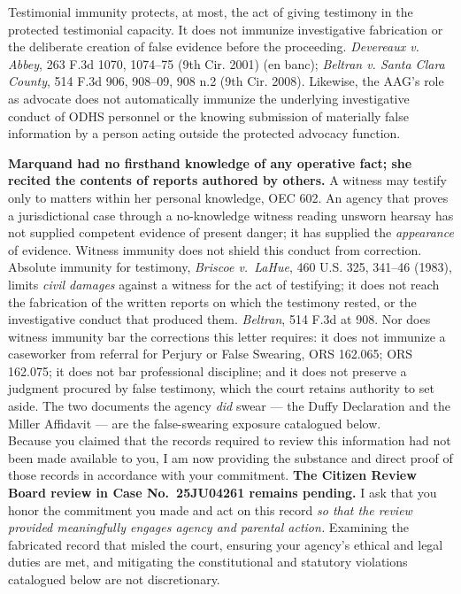 \documentclass[10pt,a4paper,roman]{moderncv}
\begin{document}
\begin{enumerate}[leftmargin=*,itemsep=0.35em,topsep=0.3em,resume]
Testimonial immunity protects, at most, the act of giving testimony in the protected testimonial capacity. It does not immunize investigative fabrication or the deliberate creation of false evidence before the proceeding. \textit{Devereaux v. Abbey}, 263 F.3d 1070, 1074--75 (9th Cir. 2001) (en banc); \textit{Beltran v. Santa Clara County}, 514 F.3d 906, 908--09, 908 n.2 (9th Cir. 2008). Likewise, the AAG's role as advocate does not automatically immunize the underlying investigative conduct of ODHS personnel or the knowing submission of materially false information by a person acting outside the protected advocacy function.

\textbf{Marquand had no firsthand knowledge of any operative fact; she recited the contents of reports authored by others.} A witness may testify only to matters within her personal knowledge, OEC 602. An agency that proves a jurisdictional case through a no-knowledge witness reading unsworn hearsay has not supplied competent evidence of present danger; it has supplied the \emph{appearance} of evidence. Witness immunity does not shield this conduct from correction. Absolute immunity for testimony, \emph{Briscoe v.~LaHue}, 460 U.S. 325, 341--46 (1983), limits \emph{civil damages} against a witness for the act of testifying; it does not reach the fabrication of the written reports on which the testimony rested, or the investigative conduct that produced them. \emph{Beltran}, 514 F.3d at 908. Nor does witness immunity bar the corrections this letter requires: it does not immunize a caseworker from referral for Perjury or False Swearing, ORS 162.065; ORS 162.075; it does not bar professional discipline; and it does not preserve a judgment procured by false testimony, which the court retains authority to set aside. The two documents the agency \emph{did} swear --- the Duffy Declaration and the Miller Affidavit --- are the false-swearing exposure catalogued below.\\

Because you claimed that the records required to review this information had not been made available to you, I am now providing the substance and direct proof of those records in accordance with your commitment. \textbf{The Citizen Review Board review in Case No.~25JU04261 remains pending.} I ask that you honor the commitment you made and act on this record \textit{so that the review provided meaningfully engages agency and parental action.} Examining the fabricated record that misled the court, ensuring your agency's ethical and legal duties are met, and mitigating the constitutional and statutory violations catalogued below are not discretionary.\\


\end{enumerate}
\end{document}
